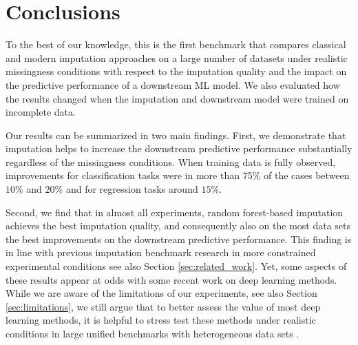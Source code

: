 \section{Conclusions}
\label{sec:conclusion}
%
To the best of our knowledge, this is the first benchmark that compares classical and modern imputation approaches on a large number of datasets under realistic missingness conditions with respect to the imputation quality and the impact on the predictive performance of a downstream ML model. We also evaluated how the results changed when the imputation and downstream model were trained on incomplete data.

Our results can be summarized in two main findings. First, we demonstrate that imputation helps to increase the downstream predictive performance substantially regardless of the missingness conditions. When training data is fully observed, improvements for classification tasks were in more than 75\% of the cases between $10\%$ and $20\%$ and for regression tasks around $15\%$.

Second, we find that in almost all experiments, random forest-based imputation achieves the best imputation quality, and consequently also on the most data sets the best improvements on the downstream predictive performance. This finding is in line with previous imputation benchmark research in more constrained experimental conditions see also Section \ref{sec:related_work}. Yet, some aspects of these results appear at odds with some recent work on deep learning methods. While we are aware of the limitations of our experiments, see also Section \ref{sec:limitations}, we still argue that to better assess the value of most deep learning methods, it is helpful to stress test these methods under realistic conditions in large unified benchmarks with heterogeneous data sets \citep{Sculley2018, Bender2021}.
